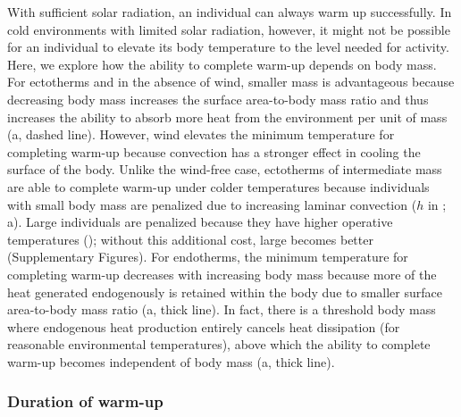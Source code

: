 With sufficient solar radiation, an individual can always warm up successfully. %
In cold environments with limited solar radiation, however, it might not be possible for an individual to elevate its body temperature to the level needed for activity.
Here, we explore how the ability to complete warm-up depends on body mass.
For ectotherms and in the absence of wind, smaller mass is advantageous because decreasing body mass increases the surface area-to-body mass ratio and thus increases the ability to absorb more heat from the environment per unit of mass (a, dashed line).
However, wind elevates the minimum temperature for completing warm-up because convection has a stronger effect in cooling the surface of the body.
Unlike the wind-free case, ectotherms of intermediate mass are able to complete warm-up under colder temperatures because individuals with small body mass are penalized due to increasing laminar convection ($h$ in ; a).
Large individuals are penalized because they have higher operative temperatures (); without this additional cost, large becomes better (Supplementary Figures).
For endotherms, the minimum temperature for completing warm-up decreases with increasing body mass because more of the heat generated endogenously is retained within the body due to smaller surface area-to-body mass ratio (a, thick line).
In fact, there is a threshold body mass where endogenous heat production entirely cancels heat dissipation (for reasonable environmental temperatures), above which the ability to complete warm-up becomes independent of body mass (a, thick line).

\subsubsection*{Duration of warm-up}

